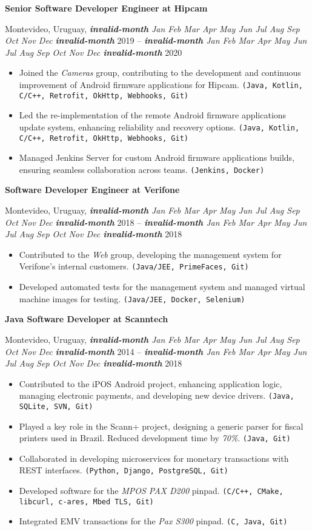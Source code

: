 \documentclass[a4paper]{article}
\newcommand{\invalidmonth}{\emph{\textbf{invalid-month}}}
\newcommand{\cvmonth}[1]{
  \ifcase#1 \invalidmonth
    \or Jan
    \or Feb
    \or Mar
    \or Apr
    \or May
    \or Jun
    \or Jul
    \or Aug
    \or Sep
    \or Oct
    \or Nov
    \or Dec
  \else
    \invalidmonth
  \fi
}
\newcommand{\cvdate}[2]{
  \emph{\cvmonth{#1}} {#2}
}
\newcommand{\cvposition}[2]{
  \noindent\textbf{#1 at #2}\par
}
\newcommand{\cvlocation}[3]{
  \noindent #1, #2 -- #3\par
}
\newenvironment{cvexperience}{
  \noindent{\large\textbf{Work Experience:}}
  \medskip
}{
  \bigskip
}
\newenvironment{cvjob}{
  \begin{sloppypar}
}{
  \end{sloppypar}
  \bigskip
}
\newcommand{\cvskills}[1]{\texttt{(#1)}}
\begin{document}
\begin{cvexperience}
\begin{cvjob}
  \cvposition{Senior Software Developer Engineer}{Hipcam}
  \cvlocation{Montevideo, Uruguay}{\cvdate{2}{2019}}{\cvdate{5}{2020}}
  \begin{itemize}
    \item Joined the \emph{Cameras} group, contributing to the development and continuous improvement of Android firmware
    applications for Hipcam. \cvskills{Java, Kotlin, C/C++, Retrofit, OkHttp, Webhooks, Git}
    \item Led the re-implementation of the remote Android firmware applications update system, enhancing reliability and recovery options. 
    \cvskills{Java, Kotlin, C/C++, Retrofit, OkHttp, Webhooks, Git}
    \item Managed Jenkins Server for custom Android firmware applications builds, ensuring seamless collaboration across teams. 
    \cvskills{Jenkins, Docker}
  \end{itemize}
\end{cvjob}

\begin{cvjob}
  \cvposition{Software Developer Engineer}{Verifone}
  \cvlocation{Montevideo, Uruguay}{\cvdate{5}{2018}}{\cvdate{11}{2018}}
  \begin{itemize}
    \item Contributed to the \emph{Web} group, developing the management system for Verifone's internal customers. \cvskills{Java/JEE, PrimeFaces, Git}
    \item Developed automated tests for the management system and managed virtual machine images for testing. \cvskills{Java/JEE, Docker, Selenium}
  \end{itemize}
\end{cvjob}


\begin{cvjob}
  \cvposition{Java Software Developer}{Scanntech}
  \cvlocation{Montevideo, Uruguay}{\cvdate{8}{2014}}{\cvdate{4}{2018}}
  \begin{itemize}
    \item Contributed to the iPOS Android project, enhancing application logic, managing electronic payments, 
    and developing new device drivers. \cvskills{Java, SQLite, SVN, Git}
    \item Played a key role in the Scann+ project, designing a generic parser for fiscal printers used in Brazil. 
    Reduced development time by \emph{70\%}. \cvskills{Java, Git}
    \item Collaborated in developing microservices for monetary transactions with REST interfaces. 
    \cvskills{Python, Django, PostgreSQL, Git}
    \item Developed software for the \emph{MPOS PAX D200} pinpad. \cvskills{C/C++, CMake, libcurl, c-ares, Mbed TLS, Git}
    \item Integrated EMV transactions for the \emph{Pax S300} pinpad. \cvskills{C, Java, Git}
  \end{itemize}
\end{cvjob}


\end{cvexperience}
\end{document}
